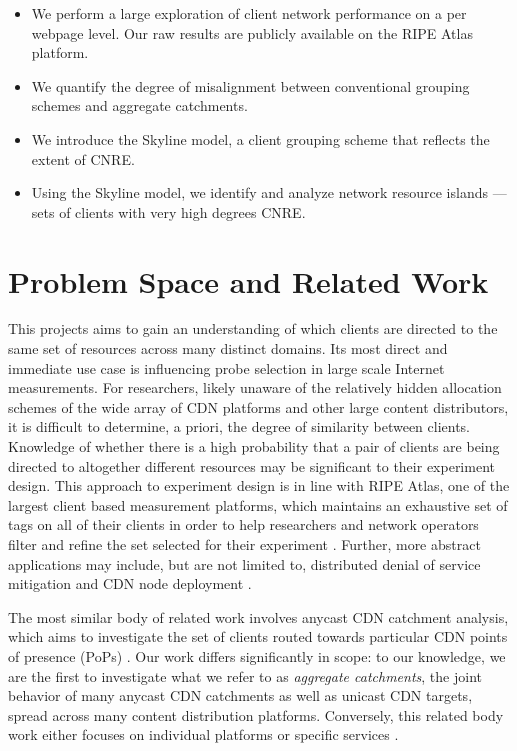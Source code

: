 \begin{itemize}%
    \item We perform a large exploration of client network performance on a per webpage level. Our
        raw results are publicly available on the RIPE Atlas platform.
    \item  We quantify the degree of misalignment between conventional grouping schemes
        and aggregate catchments.
    \item  We introduce the Skyline model, a client grouping scheme that reflects the
        extent of CNRE.
    \item  Using the Skyline model, we identify and analyze network resource islands --- 
        sets of clients with very high degrees CNRE. 
\end{itemize}

\section{Problem Space and Related Work} \label{skyspace}

This projects aims to gain an understanding of which clients are directed to the same set of
resources across many distinct domains. Its most direct and immediate use case is influencing probe
selection in large scale Internet measurements. For researchers, likely unaware of the relatively
hidden allocation schemes of the wide array of CDN platforms and other large content distributors,
it is difficult to determine, a priori, the degree of similarity between clients. Knowledge of
whether there is a high probability that a pair of clients are being directed to altogether
different resources may be significant to their experiment design. This approach to experiment
design is in line with RIPE Atlas, one of the largest client based measurement platforms,
which maintains
an exhaustive set of tags on all of their clients in order to help researchers and network operators
filter and refine the set selected for their experiment \cite{ripe-atlas}. Further, more abstract
applications may include, but are not limited to, distributed denial of service mitigation
\cite{anycastvsddos} and CDN node deployment \cite{35590, Tariq}.

The most similar body of related work involves anycast CDN catchment analysis, which aims to
investigate the set of clients routed towards particular CDN points of presence (PoPs)
\cite{Calder2015, anycastvsddos, vdmscatchment}. Our work differs significantly in scope: to our 
knowledge, we are the first to investigate what we refer to as \emph{aggregate catchments}, the joint
behavior of many anycast CDN catchments as well as unicast CDN targets, spread across many content
distribution platforms. Conversely, this related body work either focuses on individual platforms or
specific services \cite{Calder2015, anycastvsddos, vdmscatchment}. 

